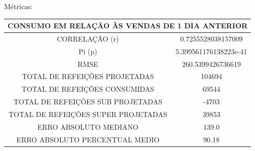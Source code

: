 \documentclass[	12pt, Times, openright, twoside, a4paper, english, brazil]{abntex2}
\begin{document}
                    \begin{figure}[H]
                    \end{figure}
                    
                    
                    Métricas:
                    
                     \begin{tabular}{|c|c|}\hline
                    \multicolumn{2}{c}{CONSUMO EM RELAÇÃO ÀS VENDAS DE 1 DIA ANTERIOR}\\ \hline
                    CORRELAÇÃO (r) &  0.7255528038157009\\
                    Pi (p) &5.399561176138223e-41\\
                    RMSE & 260.5399426736619\\
                    TOTAL DE REFEIÇÕES PROJETADAS & 104694\\ 
                    TOTAL DE REFEIÇÕES CONSUMIDAS & 69544\\
                    TOTAL DE REFEIÇÕES SUB PROJETADAS & -4703\\
                    TOTAL DE REFEIÇÕES SUPER PROJETADAS & 39853\\
                    ERRO ABSOLUTO MEDIANO & 139.0\\
                    ERRO ABSOLUTO PERCENTUAL MEDIO & 90.18\\\hline
                    \end{tabular}
                    
\end{document}
